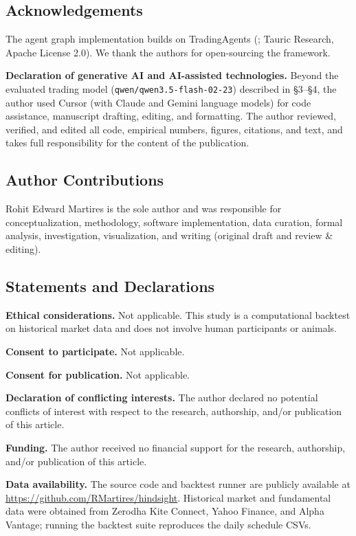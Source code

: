 \documentclass{article}
\begin{document}
\subsection{Acknowledgements}\label{acknowledgements}

The agent graph implementation builds on TradingAgents
(\citealp{xiao2024tradingagents}; Tauric Research, Apache License 2.0). We thank the authors
for open-sourcing the framework.

\textbf{Declaration of generative AI and AI-assisted technologies.} Beyond the evaluated trading model (\texttt{qwen/qwen3.5-flash-02-23}) described in §3--§4, the author used Cursor (with Claude and Gemini language models) for code assistance, manuscript drafting, editing, and formatting. The author reviewed, verified, and edited all code, empirical numbers, figures, citations, and text, and takes full responsibility for the content of the publication.

\subsection{Author Contributions}\label{author-contributions}

Rohit Edward Martires is the sole author and was responsible for conceptualization, methodology, software implementation, data curation, formal analysis, investigation, visualization, and writing (original draft and review \& editing).

\subsection{Statements and Declarations}\label{statements-and-declarations}

\textbf{Ethical considerations.} Not applicable. This study is a computational backtest on historical market data and does not involve human participants or animals.

\textbf{Consent to participate.} Not applicable.

\textbf{Consent for publication.} Not applicable.

\textbf{Declaration of conflicting interests.} The author declared no potential conflicts of interest with respect to the research, authorship, and/or publication of this article.

\textbf{Funding.} The author received no financial support for the research, authorship, and/or publication of this article.

\textbf{Data availability.} The source code and backtest runner are publicly available at \url{https://github.com/RMartires/hindsight}. Historical market and fundamental data were obtained from Zerodha Kite Connect, Yahoo Finance, and Alpha Vantage; running the backtest suite reproduces the daily schedule CSVs.


\end{document}
